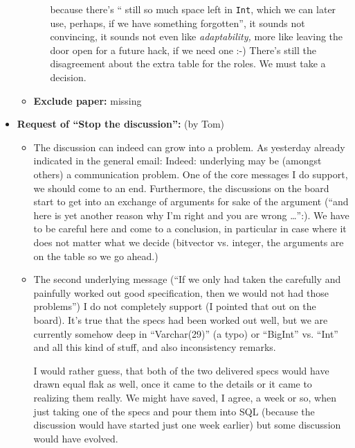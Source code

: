 \begin{itemize}
\begin{itemize}
\begin{itemize}
    because there's `` still so much space left in \texttt{Int}, which we can
    later use, perhaps, if we have something forgotten'', it sounds not
    convincing, it sounds not even like \emph{adaptability,} more like leaving
    the door open for a future hack, if we need one :-) There's still the
    disagreement about the extra table for the roles. We must take a decision.
  \end{itemize}
\item\textbf{Exclude paper:} missing
  \end{itemize}
\item \textbf{Request of ``Stop the discussion'':} (by Tom) 
  \begin{itemize}
  \item The discussion can indeed can grow into a problem. As yesterday
    already indicated in the general email: Indeed: underlying may be
    (amongst others) a communication problem. One of the core messages I do
    support, we should come to an end. Furthermore, the discussions on the
    board start to get into an exchange of arguments for sake of the
    argument (``and here is yet another reason why I'm right and you are
    wrong \ldots'':). We have to be careful here and come to a conclusion,
    in particular in case where it does not matter what we decide
    (bitvector vs. integer, the arguments are on the table so we go ahead.)
  \item The second underlying message (``If we only had taken the carefully
    and painfully worked out good specification, then we would not had
    those problems'') I do not completely support (I pointed that out on
    the board). It's true that the specs had been worked out well, but we
    are currently somehow deep in ``Varchar(29)'' (a typo) or ``BigInt''
    vs. ``Int'' and all this kind of stuff, and also inconsistency remarks.
    
    I would rather guess, that both of the two delivered specs would have
    drawn equal flak as well, once it came to the details or it came to
    realizing them really. We might have saved, I agree, a week or so, when
    just taking one of the specs and pour them into SQL (because the
    discussion would have started just one week earlier) but some discussion
    would have evolved.  
    

\end{itemize}
\end{itemize}
